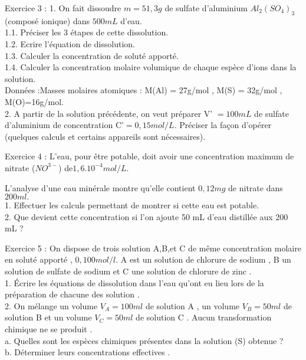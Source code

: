 \documentclass[12pt, french]{article}
\begin{document}
\begin{Box2}{Exercice 3 :}
1. On fait dissoudre $m = 51,3 g$ de sulfate d'aluminium $Al_2(SO_4)_3$ (composé ionique) dans $500 mL$ d'eau.\\
1.1. Préciser les 3 étapes de cette dissolution.\\
1.2. Ecrire l'équation de dissolution.\\
1.3. Calculer la concentration de soluté apporté.\\
1.4. Calculer la concentration molaire volumique de chaque espèce d'ions dans la solution.\\
Données :Masses molaires atomiques : M(Al) = 27g/mol , M(S) = 32g/mol , M(O)=16g/mol.
\\2. A partir de la solution précédente, on veut préparer V' $= 100 mL$ de sulfate d'aluminium de concentration C'$= 0,15 mol / L.$
Préciser la façon d'opérer (quelques calculs et certains appareils sont nécessaires).

\end{Box2}

\begin{Box2}{Exercice 4 : }
   L'eau, pour être potable, doit avoir une concentration maximum de nitrate ($NO^{3-}$) de$1,6.10^{-4} mol/L.$

L'analyse d'une eau minérale montre qu'elle contient $0,12 mg$ de nitrate dans $200 ml.$\\
1. Effectuer les calculs permettant de montrer si cette eau est potable.\\
2. Que devient cette concentration si l'on ajoute 50 mL d'eau distillée aux 200 mL ?
\end{Box2}


\begin{Box2}{Exercice 5 : }
On dispose de trois solution A,B,et C de même concentration molaire en soluté apporté , 
$0, 100mol/l.$ A est un solution de chlorure de sodium , B un solution de sulfate de sodium et C
une solution de chlorure de zinc .\\
1. Écrire les équations de dissolution dans l’eau qu’ont eu lieu lors de la préparation de
chacune des solution .\\
2. On mélange un volume $V_A = 100ml$ de solution A , un volume $V_B = 50ml$ de solution B
et un volume $V_C = 50ml$ de solution C . Aucun transformation chimique ne se produit .\\
a. Quelles sont les espèces chimiques présentes dans la solution (S) obtenue ?\\
b. Déterminer leurs concentrations effectives .\\
\end{Box2}
\end{document}
